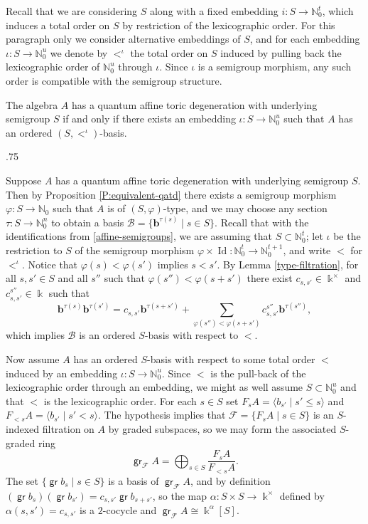 \documentclass[11pt,fleqn]{article}
\makeatletter
\renewenvironment{proof}[1][\textit{Proof}]{\par
  \pushQED{\qed}%
  \normalfont \topsep.75\paraskip\relax
  \trivlist
  \item[\hskip\labelsep
        \itshape
    #1\@addpunct{.}]\ignorespaces
}{%
  \popQED\endtrivlist\@endpefalse
}
\newcommand\NN{\mathbb N}
\renewcommand\to{\longrightarrow}
\renewcommand\phi{\varphi}
\newcommand\F{\mathcal F}
\renewcommand\b{\mathbf b}
\renewcommand\k{\Bbbk}
\DeclareMathOperator\gr{\mathsf{gr}}
\DeclareMathOperator\Id{Id}
\makeatother
\begin{document}
Recall that we are considering $S$ along with a fixed embedding $i: S \to \NN_0^t$,
which induces a total order on $S$ by restriction of the lexicographic order. For this
paragraph only we consider alternative embeddings of $S$, and for each embedding
$\iota: S \to \NN_0^u$ we denote by $<^\iota$ the total order on $S$ induced by pulling 
back the lexicographic order of $\NN_0^u$ through $\iota$. Since $\iota$ is a semigroup
morphism, any such order is compatible with the semigroup structure.
\begin{Proposition*}
The algebra $A$ has a quantum affine toric degeneration with underlying semigroup $S$ if 
and only if there exists an embedding $\iota: S \to \NN_0^u$ such that $A$ has an 
ordered $(S, <^\iota)$-basis.
\end{Proposition*}
\begin{proof}
Suppose $A$ has a quantum affine toric degeneration with underlying semigroup $S$. Then 
by Proposition \ref{P:equivalent-qatd} there exists a semigroup morphism $\phi:S\to 
\NN_0$ such that $A$ is of $(S, \phi)$-type, and we may choose any section $\tau: S \to 
\NN_0^n$ to obtain a basis $\mathcal B = \{\b^{\tau(s)} \mid s \in S\}$. Recall that with
the identifications from \ref{affine-semigroups}, we are assuming that $S \subset 
\NN_0^t$; let $\iota$ be the restriction to $S$ of the semigroup morphism $\phi \times 
\Id: \NN_0^t \to \NN_0^{t+1}$, and write $<$ for $<^\iota$. Notice that $\phi(s) < 
\phi(s')$ implies $s<s'$. By Lemma 
\ref{type-filtration}, for all $s,s' \in S$ and all $s''$ such that $\phi(s'') < 
\phi(s+s')$ there exist $c_{s,s'} \in \k^\times$ and $c_{s,s'}^{s''} \in \k$ such that
\[
  \b^{\tau(s)}\b^{\tau(s')} 
    = c_{s,s'}\b^{\tau(s+s')} 
      + \sum_{\phi(s'') < \phi(s+s')} c_{s,s'}^{s''} \b^{\tau(s'')},
\]
which implies $\mathcal B$ is an ordered $S$-basis with respect to $<$.

Now assume $A$ has an ordered $S$-basis with respect to some total order $<$ induced 
by an embedding $\iota: S \to \NN_0^u$. Since $<$ is the pull-back of the lexicographic 
order through an embedding, we might as well assume $S \subset \NN_0^u$ and that $<$ is 
the lexicographic order. For each $s \in S$ set $F_sA = \langle b_{s'} \mid s' \leq s 
\rangle$ and $F_{<s}A = \langle b_{s'} \mid s' < s \rangle$. The hypothesis implies that
$\mathcal F = \{F_sA \mid s \in S\}$ is an $S$-indexed filtration on $A$ by graded 
subspaces, so we may form the associated $S$-graded ring
\[
  \gr_\F A = \bigoplus_{s \in S} \frac{F_sA}{F_{<s}A}.
\]
The set $\{\gr b_s \mid s \in S\}$ is a basis of $\gr_\F A$, and by definition
$(\gr b_s) (\gr b_{s'}) = c_{s,s'} \gr b_{s+s'}$, so the map $\alpha: S \times S \to 
\k^\times$ defined by $\alpha(s,s') = c_{s,s'}$ is a $2$-cocycle and $\gr_\F A \cong 
\k^\alpha[S]$.


\end{proof}
\end{document}
